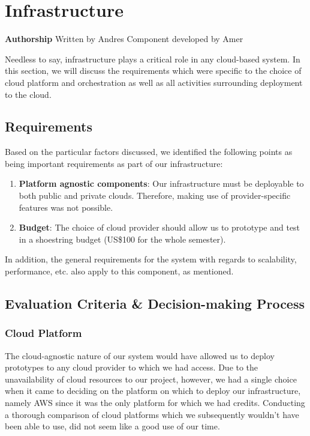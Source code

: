 \section{Infrastructure}\label{infrastructure}

\textbf{Authorship} Written by Andres Component developed by Amer

Needless to say, infrastructure plays a critical role in any cloud-based
system. In this section, we will discuss the requirements which were
specific to the choice of cloud platform and orchestration as well as
all activities surrounding deployment to the cloud.

\subsection{Requirements}\label{requirements}

Based on the particular factors discussed, we identified the following
points as being important requirements as part of our infrastructure:

\begin{enumerate}
\def\labelenumi{\arabic{enumi}.}
\tightlist
\item
  \textbf{Platform agnostic components}: Our infrastructure must be
  deployable to both public and private clouds. Therefore, making use of
  provider-specific features was not possible.
\item
  \textbf{Budget}: The choice of cloud provider should allow us to
  prototype and test in a shoestring budget (US\$100 for the whole
  semester).
\end{enumerate}

In addition, the general requirements for the system with regards to
scalability, performance, etc. also apply to this component, as
mentioned.

\subsection{Evaluation Criteria \& Decision-making
Process}\label{evaluation-criteria-decision-making-process}

\subsubsection{Cloud Platform}\label{cloud-platform}

The cloud-agnostic nature of our system would have allowed us to deploy
prototypes to any cloud provider to which we had access. Due to the
unavailability of cloud resources to our project, however, we had a
single choice when it came to deciding on the platform on which to
deploy our infrastructure, namely AWS since it was the only platform for
which we had credits. Conducting a thorough comparison of cloud
platforms which we subsequently wouldn't have been able to use, did not
seem like a good use of our time.

